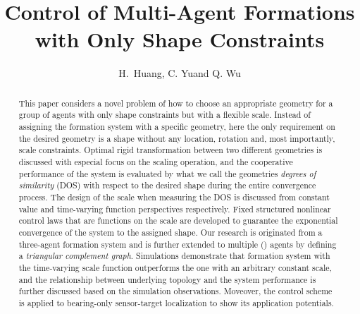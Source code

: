 \documentclass[times]{rncauth}
\begin{document}

\title{Control of Multi-Agent Formations with Only Shape Constraints
\footnotemark[2]}

\author{H.~Huang\footnotemark[3], C. Yu\corrauth and Q. Wu\footnotemark[3]}


\begin{abstract}This paper considers a novel problem of how to
choose an appropriate geometry for a group of agents with only shape
constraints but with a flexible scale. Instead of assigning the
formation system with a specific geometry, here the only requirement
on the desired geometry is a shape without any location, rotation
and, most importantly, scale constraints. Optimal rigid
transformation between two different geometries is discussed with
especial focus on the scaling operation, and the cooperative
performance of the system is evaluated by what we call the geometries
 \emph{degrees of similarity} (DOS) with respect to the desired shape during the entire convergence process. The design  of the
scale when measuring the DOS is discussed from constant value and time-varying function
perspectives respectively. Fixed structured nonlinear  control laws
that are functions on the scale are developed to guarantee the
exponential convergence of the system to the assigned shape. Our
research is originated from a three-agent formation system and is
further extended to multiple () agents by defining a
\emph{triangular complement graph}. Simulations demonstrate that
formation system with the time-varying scale function outperforms
the one with an arbitrary constant scale, and the relationship
between underlying topology and the system performance is further
discussed based on the simulation observations. Moveover, the
control scheme is applied to bearing-only sensor-target localization
to show its application potentials.
\end{abstract}


\maketitle

\end{document}

